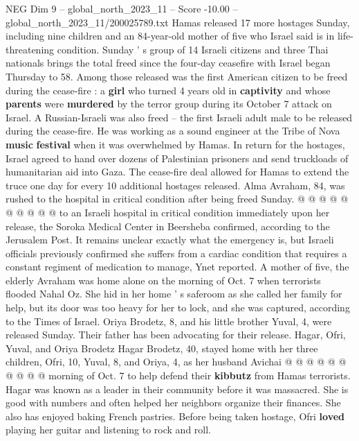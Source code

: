 \begin{textsample}{NEG Dim 9 – global\_north\_2023\_11 – Score -10.00 – global\_north\_2023\_11/200025789.txt}  \label{ex:f9_neg_063}
Hamas released 17 more hostages Sunday, including nine children and an 84-year-old mother of five who Israel said is in life-threatening condition.
Sunday ' s group of 14 Israeli citizens and three Thai nationals brings the total freed since the four-day ceasefire with Israel began Thursday to 58.
Among those released was the first American citizen to be freed during the cease-fire : a \textbf{girl} who turned 4 years old in \textbf{captivity} and whose \textbf{parents} were \textbf{murdered} by the terror group during its October 7 attack on Israel.
A Russian-Israeli was also freed -- the first Israeli adult male to be released during the cease-fire.
He was working as a sound engineer at the Tribe of Nova \textbf{music} \textbf{festival} when it was overwhelmed by Hamas.
In return for the hostages, Israel agreed to hand over dozens of Palestinian prisoners and send truckloads of humanitarian aid into Gaza.
The cease-fire deal allowed for Hamas to extend the truce one day for every 10 additional hostages released.
Alma Avraham, 84, was rushed to the hospital in critical condition after being freed Sunday. @ @ @ @ @ @ @ @ @ @ to an Israeli hospital in critical condition immediately upon her release, the Soroka Medical Center in Beersheba confirmed, according to the Jerusalem Post.
It remains unclear exactly what the emergency is, but Israeli officials previously confirmed she suffers from a cardiac condition that requires a constant regiment of medication to manage, Ynet reported.
A mother of five, the elderly Avraham was home alone on the morning of Oct. 7 when terrorists flooded Nahal Oz.
She hid in her home ' s saferoom as she called her family for help, but its door was too heavy for her to lock, and she was captured, according to the Times of Israel.
Oriya Brodetz, 8, and his little brother Yuval, 4, were released Sunday.
Their father has been advocating for their release.
Hagar, Ofri, Yuval, and Oriya Brodetz Hagar Brodetz, 40, stayed home with her three children, Ofri, 10, Yuval, 8, and Oriya, 4, as her husband Avichai @ @ @ @ @ @ @ @ @ @ morning of Oct. 7 to help defend their \textbf{kibbutz} from Hamas terrorists.
Hagar was known as a leader in their community before it was massacred.
She is good with numbers and often helped her neighbors organize their finances.
She also has enjoyed baking French pastries.
Before being taken hostage, Ofri \textbf{loved} playing her guitar and listening to rock and roll.

\end{textsample}

